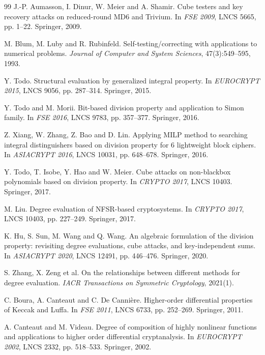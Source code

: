 \documentclass[11pt,a4paper]{article}
\theoremstyle{plain}
\theoremstyle{definition}
\theoremstyle{remark}
\begin{document}
\begin{thebibliography}{99}
 J.-P. Aumasson, I. Dinur, W. Meier and A. Shamir. Cube testers and
key recovery attacks on reduced-round MD6 and Trivium. In \emph{FSE 2009}, LNCS 5665,
pp. 1--22. Springer, 2009.

 M. Blum, M. Luby and R. Rubinfeld. Self-testing/correcting with applications
to numerical problems. \emph{Journal of Computer and System Sciences}, 47(3):549--595, 1993.

 Y. Todo. Structural evaluation by generalized integral property.
In \emph{EUROCRYPT 2015}, LNCS 9056, pp. 287--314. Springer, 2015.

 Y. Todo and M. Morii. Bit-based division property and application to
Simon family. In \emph{FSE 2016}, LNCS 9783, pp. 357--377. Springer, 2016.

 Z. Xiang, W. Zhang, Z. Bao and D. Lin. Applying MILP method to searching
integral distinguishers based on division property for 6 lightweight block ciphers.
In \emph{ASIACRYPT 2016}, LNCS 10031, pp. 648--678. Springer, 2016.

 Y. Todo, T. Isobe, Y. Hao and W. Meier. Cube attacks on non-blackbox
polynomials based on division property. In \emph{CRYPTO 2017}, LNCS 10403. Springer, 2017.

 M. Liu. Degree evaluation of NFSR-based cryptosystems.
In \emph{CRYPTO 2017}, LNCS 10403, pp. 227--249. Springer, 2017.

 K. Hu, S. Sun, M. Wang and Q. Wang. An algebraic formulation of the division
property: revisiting degree evaluations, cube attacks, and key-independent sums.
In \emph{ASIACRYPT 2020}, LNCS 12491, pp. 446--476. Springer, 2020.

 S. Zhang, X. Zeng et al. On the relationships between different methods
for degree evaluation. \emph{IACR Transactions on Symmetric Cryptology}, 2021(1).

 C. Boura, A. Canteaut and C. De Cannière. Higher-order differential
properties of Keccak and Luffa. In \emph{FSE 2011}, LNCS 6733, pp. 252--269. Springer, 2011.

 A. Canteaut and M. Videau. Degree of composition of highly nonlinear
functions and applications to higher order differential cryptanalysis.
In \emph{EUROCRYPT 2002}, LNCS 2332, pp. 518--533. Springer, 2002.

\end{thebibliography}
\end{document}
